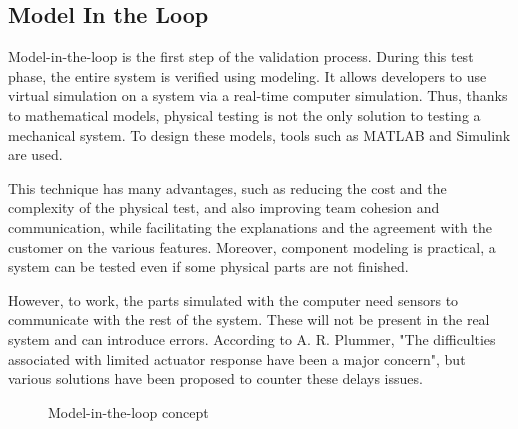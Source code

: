 \subsection{Model In the Loop}


Model-in-the-loop is the first step of the validation process. During this test phase, the entire system is verified using modeling. It allows developers to use virtual simulation on a system via a real-time computer simulation. Thus, thanks to mathematical models, physical testing is not the only solution to testing a mechanical system. To design these models, tools such as MATLAB and Simulink are used.

This technique has many advantages, such as reducing the cost and the complexity of the physical test, and also improving team cohesion and communication, while facilitating the explanations and the agreement with the customer on the various features\cite{MIL_Complex}.
Moreover, component modeling is practical, a system can be tested even if some physical parts are not finished. 

However, to work, the parts simulated with the computer need sensors to communicate with the rest of the system. These will not be present in the real system and can introduce errors. According to A. R. Plummer, "The difficulties associated with limited actuator response have been a major concern"\cite{Model_in_the_loop}, but various solutions have been proposed to counter these delays issues.

\begin{figure}[ht]
    \centering 
    \caption{Model-in-the-loop concept\cite{Model_in_the_loop}}
\end{figure}

